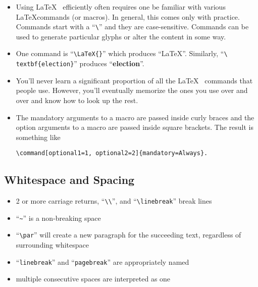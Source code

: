 \begin{itemize}

\item \par Using \LaTeX ~ efficiently often requires one be familiar with
  various \LaTeX commands (or macros). In general, this comes only with
  practice. Commands start with a ``\texttt{\textbackslash}'' and they
  are case-sensitive. Commands can be used to generate particular glyphs
  or alter the content in some way.
  
\item \par One command is ``\texttt{\textbackslash LaTeX\{\}}'' which
  produces ``\LaTeX''. Similarly, ``\texttt{\textbackslash
    textbf\{election\}}'' produces ``\textbf{election}''.
  
\item \par You'll never learn a significant proportion of all the \LaTeX~
  commands that people use. However, you'll eventually memorize the ones
  you use over and over and know how to look up the rest.
  
\item \par The mandatory arguments to a macro are passed inside curly braces
  and the option arguments to a macro are passed inside square
  brackets. The result is something like 
\begin{verbatim}
\command[optional1=1, optional2=2]{mandatory=Always}.
\end{verbatim}
  
\end{itemize}

\subsection*{Whitespace and Spacing} 

\begin{itemize}
\item 2 or more carriage returns,
  ``\texttt{\textbackslash\textbackslash}'', and
  ``\texttt{\textbackslash linebreak}'' break lines
\item ``\texttt{\~}'' is a non-breaking space
\item ``\texttt{\textbackslash par}'' will create a new paragraph for the succeeding
  text, regardless of surrounding whitespace
\item ``\texttt{linebreak}'' and ``\texttt{pagebreak}'' are
  appropriately named
\item multiple consecutive spaces are interpreted as one
\end{itemize}


